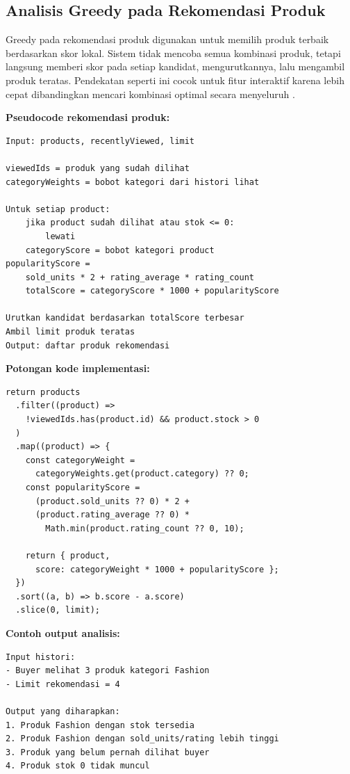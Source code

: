 \subsection{Analisis Greedy pada Rekomendasi Produk}

Greedy pada rekomendasi produk digunakan untuk memilih produk terbaik berdasarkan skor lokal. Sistem tidak mencoba semua kombinasi produk, tetapi langsung memberi skor pada setiap kandidat, mengurutkannya, lalu mengambil produk teratas. Pendekatan seperti ini cocok untuk fitur interaktif karena lebih cepat dibandingkan mencari kombinasi optimal secara menyeluruh \parencite{Tanujaya2026}.

\textbf{Pseudocode rekomendasi produk:}

\begin{Verbatim}[frame=single,framesep=6pt,fontsize=\scriptsize]
Input: products, recentlyViewed, limit

viewedIds = produk yang sudah dilihat
categoryWeights = bobot kategori dari histori lihat

Untuk setiap product:
    jika product sudah dilihat atau stok <= 0:
        lewati
    categoryScore = bobot kategori product
popularityScore =
    sold_units * 2 + rating_average * rating_count
    totalScore = categoryScore * 1000 + popularityScore

Urutkan kandidat berdasarkan totalScore terbesar
Ambil limit produk teratas
Output: daftar produk rekomendasi
\end{Verbatim}

\textbf{Potongan kode implementasi:}

\begin{Verbatim}[frame=single,framesep=6pt,fontsize=\scriptsize]
return products
  .filter((product) =>
    !viewedIds.has(product.id) && product.stock > 0
  )
  .map((product) => {
    const categoryWeight =
      categoryWeights.get(product.category) ?? 0;
    const popularityScore =
      (product.sold_units ?? 0) * 2 +
      (product.rating_average ?? 0) *
        Math.min(product.rating_count ?? 0, 10);

    return { product,
      score: categoryWeight * 1000 + popularityScore };
  })
  .sort((a, b) => b.score - a.score)
  .slice(0, limit);
\end{Verbatim}

\textbf{Contoh output analisis:}

\begin{Verbatim}[frame=single,framesep=6pt,fontsize=\scriptsize]
Input histori:
- Buyer melihat 3 produk kategori Fashion
- Limit rekomendasi = 4

Output yang diharapkan:
1. Produk Fashion dengan stok tersedia
2. Produk Fashion dengan sold_units/rating lebih tinggi
3. Produk yang belum pernah dilihat buyer
4. Produk stok 0 tidak muncul
\end{Verbatim}

